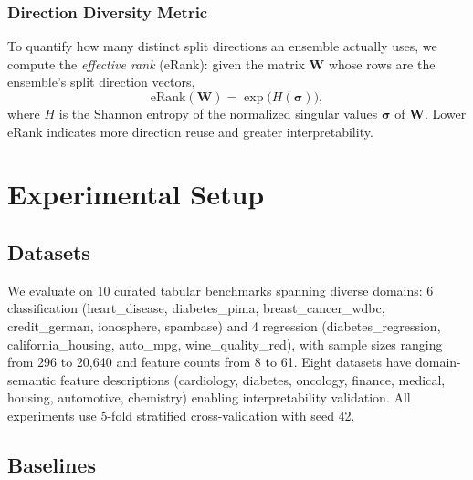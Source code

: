 \documentclass[11pt,letterpaper]{article}
\begin{document}
\subsubsection{Direction Diversity Metric}

To quantify how many distinct split directions an ensemble actually uses, we compute the \emph{effective rank} (eRank): given the matrix $\mathbf{W}$ whose rows are the ensemble's split direction vectors,
\begin{equation}
\text{eRank}(\mathbf{W}) = \exp\!\bigl(H(\bm{\sigma})\bigr),
\end{equation}
where $H$ is the Shannon entropy of the normalized singular values $\bm{\sigma}$ of $\mathbf{W}$. Lower eRank indicates more direction reuse and greater interpretability.

\section{Experimental Setup}

\subsection{Datasets}

We evaluate on 10 curated tabular benchmarks spanning diverse domains: 6 classification (heart\_disease, diabetes\_pima, breast\_cancer\_wdbc, credit\_german, ionosphere, spambase) and 4 regression (diabetes\_regression, california\_housing, auto\_mpg, wine\_quality\_red), with sample sizes ranging from 296 to 20,640 and feature counts from 8 to 61. Eight datasets have domain-semantic feature descriptions (cardiology, diabetes, oncology, finance, medical, housing, automotive, chemistry) enabling interpretability validation. All experiments use 5-fold stratified cross-validation with seed 42.

\subsection{Baselines}
\end{document}
